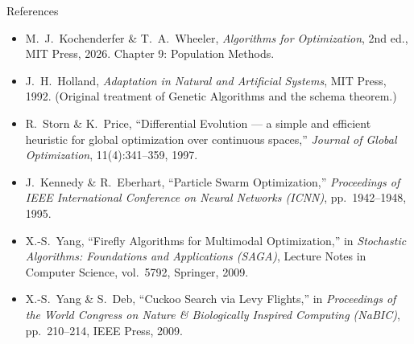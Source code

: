 \documentclass[aspectratio=169,10pt]{beamer}
\begin{document}
\begin{frame}[allowframebreaks]{References}
  \begin{itemize}
    \item M.\ J.\ Kochenderfer \& T.\ A.\ Wheeler,
          \textit{Algorithms for Optimization}, 2nd ed., MIT Press, 2026.
          Chapter 9: Population Methods.
    \item J.\ H.\ Holland, \textit{Adaptation in Natural and Artificial
          Systems}, MIT Press, 1992.  (Original treatment of
          Genetic Algorithms and the schema theorem.)
    \item R.\ Storn \& K.\ Price, ``Differential Evolution --- a simple
          and efficient heuristic for global optimization over
          continuous spaces,'' \textit{Journal of Global Optimization},
          11(4):341--359, 1997.
    \item J.\ Kennedy \& R.\ Eberhart, ``Particle Swarm Optimization,''
          \textit{Proceedings of IEEE International Conference on
          Neural Networks (ICNN)}, pp.\ 1942--1948, 1995.
    \item X.-S.\ Yang, ``Firefly Algorithms for Multimodal
          Optimization,'' in \textit{Stochastic Algorithms:
          Foundations and Applications (SAGA)}, Lecture Notes in
          Computer Science, vol.\ 5792, Springer, 2009.
    \item X.-S.\ Yang \& S.\ Deb, ``Cuckoo Search via Levy Flights,''
          in \textit{Proceedings of the World Congress on Nature \&
          Biologically Inspired Computing (NaBIC)}, pp.\ 210--214,
          IEEE Press, 2009.
  \end{itemize}
\end{frame}

\end{document}
